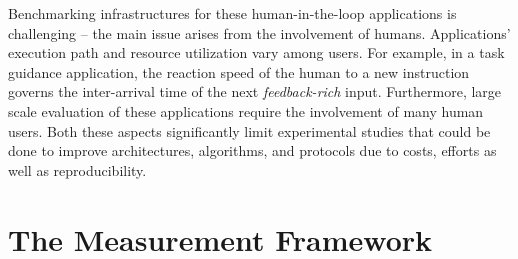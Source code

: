 
Benchmarking infrastructures for these human-in-the-loop applications is challenging -- the main issue arises from the involvement of humans. %
Applications' execution path and resource utilization vary among users. 
For example, in a task guidance application, the reaction speed of the human to a new instruction governs the inter-arrival time of the next \emph{feedback-rich} input.
Furthermore, large scale evaluation of these applications require the involvement of many human users. %
Both these aspects significantly limit experimental studies that could be done to improve architectures, algorithms, and protocols due to costs, efforts as well as reproducibility.

\section{The Measurement Framework}\label{sec:framework}


